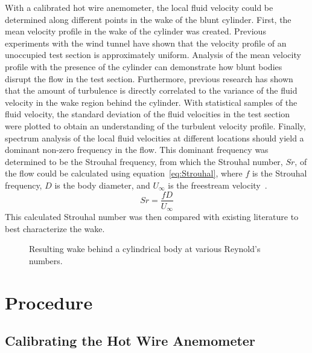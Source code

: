 \documentclass[journal,letterpaper]{IEEEtran}
\begin{document}
With a calibrated hot wire anemometer, the local fluid velocity could be determined along different points in the wake of the blunt cylinder.
First, the mean velocity profile in the wake of the cylinder was created.
Previous experiments with the wind tunnel have shown that the velocity profile of an unoccupied test section is approximately uniform.
Analysis of the mean velocity profile with the presence of the cylinder can demonstrate how blunt bodies disrupt the flow in the test section.
Furthermore, previous research has shown that the amount of turbulence is directly correlated to the variance of the fluid velocity in the wake region behind the cylinder.
With statistical samples of the fluid velocity, the standard deviation of the fluid velocities in the test section were plotted to obtain an understanding of the turbulent velocity profile.
Finally, spectrum analysis of the local fluid velocities at different locations should yield a dominant non-zero frequency in the flow.
This dominant frequency was determined to be the Strouhal frequency, from which the Strouhal number, $Sr$, of the flow could be calculated using equation~\eqref{eq:Strouhal}, where $f$ is the Strouhal frequency, $D$ is the body diameter, and $U_\infty$ is the freestream velocity~\cite{Strouhal}.
\begin{equation} \label{eq:Strouhal}
    Sr = \frac{fD}{U_\infty}
\end{equation}
This calculated Strouhal number was then compared with existing literature to best characterize the wake. 

\begin{figure}[H]
    \centering
    \caption{Resulting wake behind a cylindrical body at various Reynold's numbers.}
    \label{fig:wake}
\end{figure}

\section{Procedure}

\subsection{Calibrating the Hot Wire Anemometer}
\end{document}
